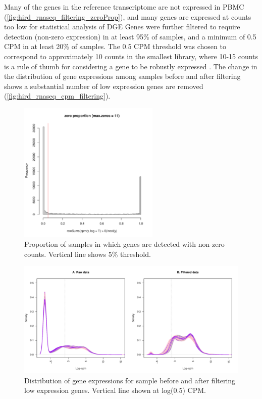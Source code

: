 Many of the genes in the reference transcriptome are not expressed in \gls{PBMC} (\autoref{fig:hird_rnaseq_filtering_zeroProp}), and many genes are expressed at counts too low for statistical analysis of \gls{DGE}
Genes were further filtered to require detection (non-zero expression) in at least 95\% of samples, and a minimum of 0.5 \gls{CPM} in at least 20\% of samples.
The 0.5 \gls{CPM} threshold was chosen to correspond to approximately 10 counts in the smallest library, where 10-15 counts is a rule of thumb for considering a gene to be robustly expressed \autocite{chen2016ReadsGenesPathways}.
The change in the distribution of gene expressions among samples before and after filtering shows a substantial number of low expression genes are removed (\autoref{fig:hird_rnaseq_cpm_filtering}).

\begin{figure}
    \centering
    \includegraphics[width=0.6\textwidth, page=1]{mainmatter/figures/chapter_02/rnaseq_data_setup.gene_zero_prop.pdf}
    \caption{Proportion of samples in which genes are detected with non-zero counts. Vertical line shows 5\% threshold.}
    \label{fig:hird_rnaseq_filtering_zeroProp}
\end{figure}

\begin{figure}
    \includegraphics[width=1.0\textwidth]{mainmatter/figures/chapter_02/rnaseq_data_setup.sample_cpm_density_filtered.pdf}
    \caption{Distribution of gene expressions for sample before and after filtering low expression genes. Vertical line shown at log(0.5) \gls{CPM}.}
    \label{fig:hird_rnaseq_cpm_filtering}
\end{figure}


